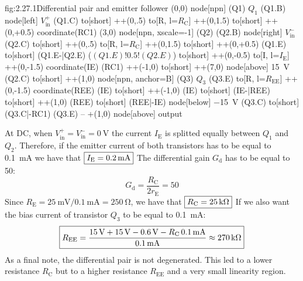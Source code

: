 \begin{circuit}{fig:2.27.1}{Differential pair and emitter follower}
    (0,0) node[npn] (Q1) {$Q_1$}
    (Q1.B) node[left] {$V_\text{in}^+$}
    (Q1.C) to[short] ++(0,.5)
    to[R, l=$R_\text{C}$] ++(0,1.5)
    to[short] ++(0,+0.5) coordinate(RC1)
    (3,0) node[npn, xscale=-1] (Q2) {}
    (Q2.B) node[right] {$V_\text{in}^-$}
    (Q2.C) to[short] ++(0,.5)
    to[R, l=$R_\text{C}$] ++(0,1.5)
    to[short] ++(0,+0.5)
    (Q1.E) to[short] (Q1.E-|Q2.E)
    ($(Q1.E)!0.5!(Q2.E)$) to[short] ++(0,-0.5)
    to[I, l=$I_\text{E}$] ++(0,-1.5) coordinate(IE)
    (RC1) ++(-1,0) to[short] ++(7,0)
    node[above] {\SI{+15}{\volt}}
    (Q2.C) to[short] ++(1,0)
    node[npn, anchor=B] (Q3) {$Q_3$}
    (Q3.E) to[R, l=$R_\text{EE}$] ++(0,-1.5) coordinate(REE)
    (IE) to[short] ++(-1,0)
    (IE) to[short] (IE-|REE)
    to[short] ++(1,0)
    (REE) to[short] (REE|-IE)
    node[below] {\SI{-15}{\volt}}
    (Q3.C) to[short] (Q3.C|-RC1)
    (Q3.E) -- +(1,0)
    node[above] {output}
\end{circuit}
At DC, when $V_\text{in}^+=V_\text{in}^-=\SI{0}{\volt}$ the current $I_\text{E}$ is splitted equally between $Q_1$ and $Q_2$. Therefore, if the emitter current of both transistors has to be equal to \SI{0.1}{\milli\ampere} we have that $\boxed{I_\text{E}=\SI{0.2}{\milli\ampere}}$
The differential gain $G_\text{d}$ has to be equal to 50:
\[G_\text{d}=\frac{R_\text{C}}{2r_\text{E}}=50\]
Since $R_\text{E}=\SI{25}{\milli\volt}/\SI{0.1}{\milli\ampere}=\SI{250}{\ohm}$, we have that $\boxed{R_\text{C}=\SI{25}{\kilo\ohm}}$
If we also want the bias current of transistor $Q_3$ to be equal to \SI{0.1}{\milli\ampere}:
\[\boxed{R_\text{EE}=\frac{\SI{15}{\volt}+\SI{15}{\volt}-\SI{0.6}{\volt}-R_\text{C}\,\SI{0.1}{\milli\ampere}}{\SI{0.1}{\milli\ampere}}\approx\SI{270}{\kilo\ohm}}\]
As a final note, the differential pair is not degenerated. This led to a lower resistance $R_\text{C}$ but to a higher resistance $R_\text{EE}$ and a very small linearity region.


